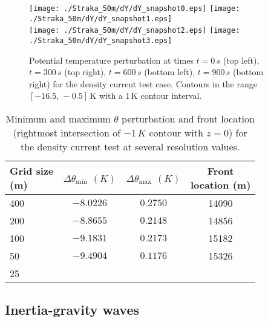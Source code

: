 \documentclass{ametsoc}
\theoremstyle{definition}
\begin{document}
\begin{figure}
\centering
 \texttt{[image: ./Straka\_50m/dY/dY\_snapshot0.eps]}
 \texttt{[image: ./Straka\_50m/dY/dY\_snapshot1.eps]}\\
 \texttt{[image: ./Straka\_50m/dY/dY\_snapshot2.eps]}
 \texttt{[image: ./Straka\_50m/dY/dY\_snapshot3.eps]}
 \caption{Potential temperature perturbation at times $t=0\, s$ (top left), $t=300\, s$ (top right), $t=600\, s$ (bottom left), $t=900\, s$ (bottom right) for the density current test case. Contours in the range $[-16.5,\,-0.5]\,\textrm{K}$ with a $1\,\textrm{K}$ contour interval.}
 \label{fig:straka}
\end{figure}

\begin{table}
\small
\begin{centering}
\begin{tabular}{lccc}
\toprule 
\shortstack{Grid size \\ (m)}& \shortstack{$\Delta\theta_\textrm{min}$ \\ $(K)$} & \shortstack{$\Delta\theta_\textrm{max}$ \\ $(K)$} & \shortstack{Front\\ location (m)} \tabularnewline
\midrule 
400 &  $-8.0226$ & $ 0.2750$ & 14090\tabularnewline
200 &  $-8.8655$ & $0.2148$ & 14856\tabularnewline
100 &  $-9.1831$ & $0.2173$ & 15182\tabularnewline
50 &  $-9.4904$ & $0.1176$ & 15326\tabularnewline
25 &  &  & \tabularnewline
\bottomrule 
\end{tabular}
\par\end{centering}
\caption{Minimum and maximum $\theta$ perturbation and front location
(rightmost intersection of $-1\,K$ contour with $z=0$) for the density current test at several resolution values.}%
\label{tab:straka_minmax}
\end{table}


\subsection{Inertia-gravity waves} 
\end{document}
